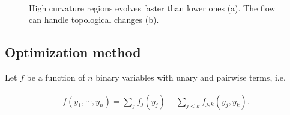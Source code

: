 \documentclass[smallextended]{svjour3}       %
\begin{document}
{\begin{figure}[!h]
\center
{}\\%
\caption{High curvature regions evolves faster than lower ones (a). The flow can handle topological changes (b). }
\label{fig:mx-speed-variation-hole-filling}
\end{figure}


\subsection{Optimization method}

Let $f$ be a function of $n$ binary variables with unary and pairwise terms, i.e.

\begin{align*}
f(y_1,\cdots, y_n) = \sum_{j}{f_j(y_j)} + \sum_{j < k}{f_{j,k}(y_j,y_k)}.
\end{align*}

}
\end{document}
